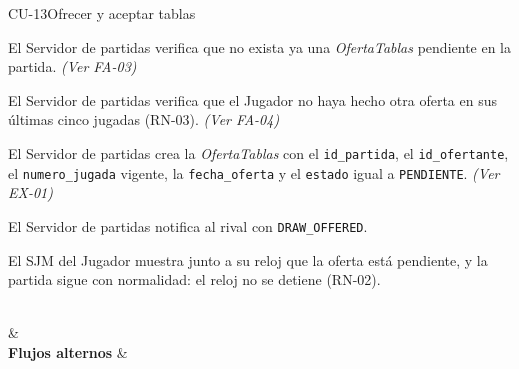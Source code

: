 \begin{fichacu}{CU-13}{Ofrecer y aceptar tablas}
{\begin{cuenum}[start=1]
      \item El Servidor de partidas verifica que no exista ya una \textit{OfertaTablas} pendiente en la partida. \textit{(Ver \mbox{FA-03})}
      \item El Servidor de partidas verifica que el Jugador no haya hecho otra oferta en sus últimas cinco jugadas (\mbox{RN-03}). \textit{(Ver \mbox{FA-04})}
      \item El Servidor de partidas crea la \textit{OfertaTablas} con el \texttt{id\_\allowbreak{}partida}, el \texttt{id\_\allowbreak{}ofertante}, el \texttt{numero\_\allowbreak{}jugada} vigente, la \texttt{fecha\_\allowbreak{}oferta} y el \texttt{estado} igual a \texttt{PENDIENTE}. \textit{(Ver \mbox{EX-01})}
      \item El Servidor de partidas notifica al rival con \texttt{DRAW\_\allowbreak{}OFFERED}.
      \item El SJM del Jugador muestra junto a su reloj que la oferta está pendiente, y la partida sigue con normalidad: el reloj no se detiene (\mbox{RN-02}).
    \end{cuenum}} \\
   &  \\ \hline
  \textbf{Flujos alternos} & 
\end{fichacu}
